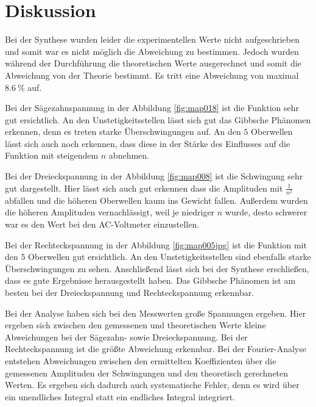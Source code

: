 \section{Diskussion}
\label{sec:Diskussion}

Bei der Synthese wurden leider die experimentellen Werte nicht aufgeschrieben und somit war es nicht möglich die Abweichung zu bestimmen. Jedoch wurden während der Durchführung die theoretischen Werte ausgerechnet und somit die Abweichung von der Theorie bestimmt. Es tritt eine Abweichung von maximal $\SI{8,6}{\percent}$ auf. 

Bei der Sägezahnspannung in der Abbildung \ref{fig:map018} ist die Funktion sehr gut ersichtlich. An den Unstetigkeitsstellen lässt sich gut das Gibbsche Phänomen erkennen, denn es treten starke Überschwingungen auf. An den $5$ Oberwellen lässt sich auch noch erkennen, dass diese in der Stärke des Einflusses auf die Funktion mit steigendem $n$ abnehmen. 

Bei der Dreieckspannung in der Abbildung \ref{fig:map008} ist die Schwingung sehr gut dargestellt. Hier lässt sich auch gut erkennen dass die Amplituden mit $\frac{1}{n^{2}}$ abfallen und die höheren Oberwellen kaum ins Gewicht fallen. Außerdem wurden die höheren Amplituden vernachlässigt, weil je niedriger $n$ wurde, desto schwerer war es den Wert bei den AC-Voltmeter einzustellen.

Bei der Rechteckspannung in der Abbildung \ref{fig:map005jpg} ist die Funktion mit den $5$ Oberwellen gut ersichtlich. An den Unstetigkeitsstellen sind ebenfalls starke Überschwingungen zu sehen.
Anschließend lässt sich bei der Synthese erschließen, dass es gute Ergebnisse herausgestellt haben. Das Gibbsche Phänomen ist am besten bei der Dreieckspannung und Rechteckspannung erkennbar. 

Bei der Analyse haben sich bei den Messwerten große Spannungen ergeben. Hier ergeben sich zwischen den gemessenen und theoretischen Werte kleine Abweichungen bei der Sägezahn- sowie Dreieckspannung. Bei der Rechteckspannung ist die größte Abweichung erkennbar. Bei der Fourier-Analyse entstehen Abweichungen zwischen den ermittelten Koeffizienten über die gemessenen Amplituden der Schwingungen und den theoretisch gerechneten Werten. Es ergeben sich dadurch auch systematische Fehler, denn es wird über ein unendliches Integral statt ein endliches Integral integriert. 